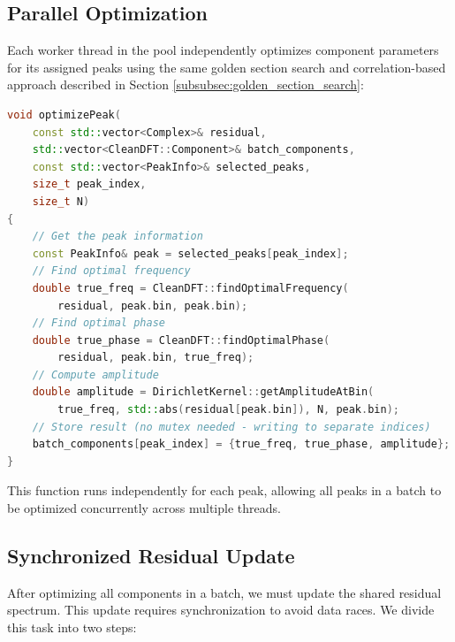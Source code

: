\documentclass[11pt,twoside]{report}
\numberwithin{thm}{section}
\numberwithin{equation}{section}
\begin{document}
\subsection{Parallel Optimization}

Each worker thread in the pool independently optimizes component parameters for its assigned peaks using the same golden section search and correlation-based approach described in Section \ref{subsubsec:golden_section_search}:

\begin{lstlisting}[language=C++, 
                   caption=Peak Optimization Worker Function, 
                   basicstyle=\footnotesize\ttfamily,
                   breaklines=true,
                   breakatwhitespace=true,
                   postbreak=\mbox{\textcolor{red}{$\hookrightarrow$}\space}]
void optimizePeak(
    const std::vector<Complex>& residual,
    std::vector<CleanDFT::Component>& batch_components,
    const std::vector<PeakInfo>& selected_peaks,
    size_t peak_index,
    size_t N)
{
    // Get the peak information
    const PeakInfo& peak = selected_peaks[peak_index];
    // Find optimal frequency
    double true_freq = CleanDFT::findOptimalFrequency(
        residual, peak.bin, peak.bin);
    // Find optimal phase
    double true_phase = CleanDFT::findOptimalPhase(
        residual, peak.bin, true_freq);
    // Compute amplitude
    double amplitude = DirichletKernel::getAmplitudeAtBin(
        true_freq, std::abs(residual[peak.bin]), N, peak.bin);
    // Store result (no mutex needed - writing to separate indices)
    batch_components[peak_index] = {true_freq, true_phase, amplitude};
}
\end{lstlisting}

This function runs independently for each peak, allowing all peaks in a batch to be optimized concurrently across multiple threads.
\newpage
\subsection{Synchronized Residual Update}

After optimizing all components in a batch, we must update the shared residual spectrum. This update requires synchronization to avoid data races. We divide this task into two steps:
\end{document}
